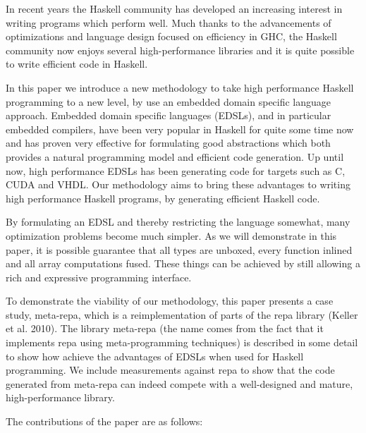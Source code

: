 \documentclass[preprint]{sigplanconf}
\begin{document}
In recent years the Haskell community has developed an increasing
interest in writing programs which perform well. Much thanks to the
advancements of optimizations and language design focused on efficiency
in GHC, the Haskell community now enjoys several high-performance
libraries and it is quite possible to write efficient code in Haskell.

In this paper we introduce a new methodology to take high performance
Haskell programming to a new level, by use an embedded domain specific
language approach. Embedded domain specific languages (EDSLs), and in
particular embedded compilers, have been very popular in Haskell for
quite some time now and has proven very effective for formulating good
abstractions which both provides a natural programming model and
efficient code generation. Up until now, high performance EDSLs has been
generating code for targets such as C, CUDA and VHDL. Our methodology
aims to bring these advantages to writing high performance Haskell
programs, by generating efficient Haskell code.

By formulating an EDSL and thereby restricting the language somewhat,
many optimization problems become much simpler. As we will demonstrate
in this paper, it is possible guarantee that all types are unboxed,
every function inlined and all array computations fused. These things
can be achieved by still allowing a rich and expressive programming
interface.

To demonstrate the viability of our methodology, this paper presents a
case study, meta-repa, which is a reimplementation of parts of the repa
library (Keller et al. 2010). The library meta-repa (the name comes from
the fact that it implements repa using meta-programming techniques) is
described in some detail to show how achieve the advantages of EDSLs
when used for Haskell programming. We include measurements against repa
to show that the code generated from meta-repa can indeed compete with a
well-designed and mature, high-performance library.

The contributions of the paper are as follows:
\end{document}
